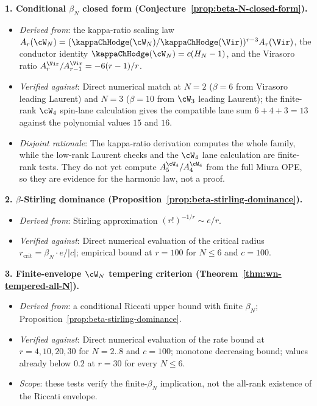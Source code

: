 \textbf{1. Conditional $\beta_N$ closed form
(Conjecture~\ref{prop:beta-N-closed-form}).}
\begin{itemize}[nosep]
\item \emph{Derived from}: the kappa-ratio scaling law
 $A_r(\cW_N)=(\kappaChHodge(\cW_N)/\kappaChHodge(\Vir))^{r-3}A_r(\Vir)$, the
 conductor identity $\kappaChHodge(\cW_N)=c(H_N-1)$, and the Virasoro ratio
 $A_r^{\Vir}/A_{r-1}^{\Vir}=-6(r-1)/r$.
\item \emph{Verified against}: Direct numerical match at $N = 2$
 ($\beta = 6$ from Virasoro leading Laurent) and $N = 3$ ($\beta =
 10$ from $\cW_3$ leading Laurent); the finite-rank $\cW_4$ spin-lane
 calculation gives the compatible lane sum $6+4+3=13$ against the polynomial
 values $15$ and $16$.
\item \emph{Disjoint rationale}: The kappa-ratio derivation computes
 the whole family, while the low-rank Laurent checks and the
 $\cW_4$ lane calculation are finite-rank tests. They do not yet
 compute $A_5^{\cW_4}/A_4^{\cW_4}$ from the full Miura OPE, so they are
 evidence for the harmonic law, not a proof.
\end{itemize}

\textbf{2. $\beta$-Stirling dominance
(Proposition~\ref{prop:beta-stirling-dominance}).}
\begin{itemize}[nosep]
\item \emph{Derived from}: Stirling approximation $(r!)^{-1/r} \sim
 e/r$.
\item \emph{Verified against}: Direct numerical evaluation of the
 critical radius $r_{\mathrm{crit}} = \beta_N \cdot e / |c|$; empirical
 bound at $r = 100$ for $N \le 6$ and $c = 100$.
\end{itemize}

\textbf{3. Finite-envelope $\cW_N$ tempering criterion
(Theorem~\ref{thm:wn-tempered-all-N}).}
\begin{itemize}[nosep]
\item \emph{Derived from}: a conditional Riccati upper bound with finite
 $\beta_N$; Proposition~\ref{prop:beta-stirling-dominance}.
\item \emph{Verified against}: Direct numerical evaluation of the rate
 bound at $r = 4, 10, 20, 30$ for $N = 2..8$ and $c = 100$; monotone
 decreasing bound; values already below $0.2$ at $r = 30$ for
 every $N \le 6$.
\item \emph{Scope}: these tests verify the finite-\(\beta_N\) implication,
 not the all-rank existence of the Riccati envelope.
\end{itemize}

